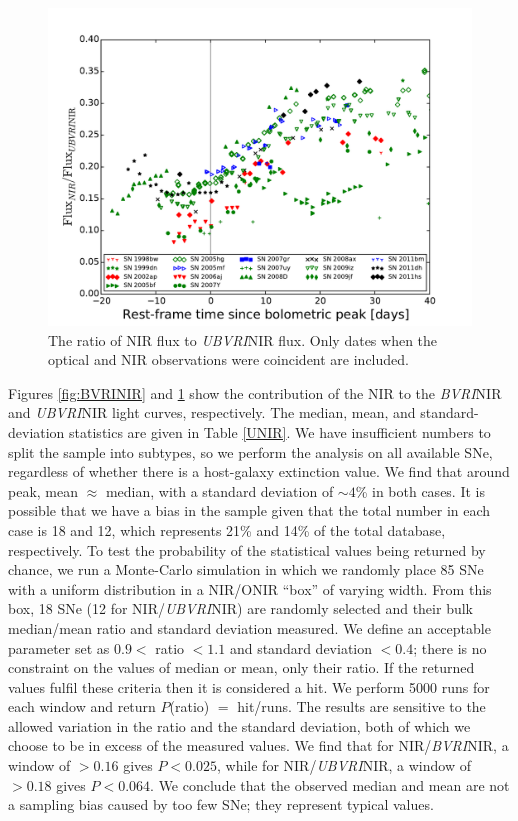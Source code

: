 \documentclass[a4paper,fleqn,usenatbib]{mnras}
\begin{document}
\begin{figure}
\centering
\includegraphics[scale=0.4]{UBVRI-NIR-fraction.pdf}
\caption{The ratio of NIR flux to \textit{UBVRI}NIR flux. Only dates when the optical and NIR observations were coincident are included.}
\label{fig:UBVRINIR}
\end{figure}

Figures \ref{fig:BVRINIR} and \ref{fig:UBVRINIR} show the contribution of the NIR to the \textit{BVRI}NIR and \textit{UBVRI}NIR light curves, respectively. The median, mean, and standard-deviation statistics are given in Table \ref{UNIR}. We have insufficient numbers to split the sample into subtypes, so we perform the analysis on all available SNe, regardless of whether there is a host-galaxy extinction value. We find that around peak, mean $\approx$ median, with a standard deviation of $\sim 4$\% in both cases. It is possible that we have a bias in the sample given that the total number in each case is 18 and 12, which represents 21\% and 14\% of the total database, respectively. To test the probability of the statistical values being returned by chance, we run a Monte-Carlo simulation in which we randomly place 85 SNe with a uniform distribution in a NIR/ONIR ``box'' of varying width. From this box, 18 SNe (12 for NIR/\textit{UBVRI}NIR) are randomly selected and their bulk median/mean ratio and standard deviation measured. We define an acceptable parameter set as $0.9 <$ ratio $<1.1$ and standard deviation $<0.4$; there is no constraint on the values of median or mean, only their ratio. If the returned values fulfil these criteria then it is considered a hit. We perform 5000 runs for each window and return $P$(ratio) $=$ hit/runs. The results are sensitive to the allowed variation in the ratio and the standard deviation, both of which we choose to be in excess of the measured values. We find that for NIR/\textit{BVRI}NIR, a window of $> 0.16$ gives $P<0.025$, while for NIR/\textit{UBVRI}NIR, a window of $> 0.18$ gives $P<0.064$. We conclude that the observed median and mean are not a sampling bias caused by too few SNe; they represent typical values.
\end{document}
